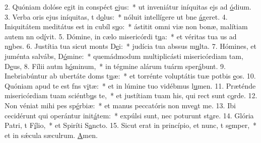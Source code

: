 2. Quóniam dolóse egit in conspéct \uline{e}jus:~* ut inveniátur iníquitas ejs ad \uline{ó}dium.
3. Verba oris ejus iníquitas, t d\uline{o}lus:~* nóluit intellígere ut bne \uline{á}geret.
4. Iniquitátem meditátus est in cubíl s\uline{u}o:~* ástitit omni viæ non bonæ, malítiam autem nn od\uline{í}vit.
5. Dómine, in cælo misericórdi t\uline{u}a:~* et véritas tua us ad n\uline{u}bes.
6. Justítia tua sicut monts D\uline{e}i:~* judícia tua abssus m\uline{u}lta.
7. Hómines, et juménta salvábs, D\uline{ó}mine:~* quemádmodum multiplicásti misericórdiam tam, D\uline{e}us,
8. Fílii autm h\uline{ó}minum,~* in tégmine alárum tuárm sper\uline{á}bunt.
9. Inebriabúntur ab ubertáte doms t\uline{u}æ:~* et torrénte voluptátis tuæ potbis \uline{e}os.
10. Quóniam apud te est fns v\uline{i}tæ:~* et in lúmine tuo vidébmus l\uline{u}men.
11. Præténde misericórdiam tuam sciéntb\uline{u}s te,~* et justítiam tuam his, qui rect sunt c\uline{o}rde.
12. Non véniat mihi pes sp\uline{é}rbiæ:~* et manus peccatóris non mve\uline{a}t me.
13. Ibi cecidérunt qui operántur init\uline{á}tem:~* expúlsi sunt, nec poturunt st\uline{a}re.
14. Glória Patri, t F\uline{í}lio,~* et Spiríti S\uline{a}ncto.
15. Sicut erat in princípio, et nunc, t s\uline{e}mper,~* et in sǽcula sæculrum. \uline{A}men.
